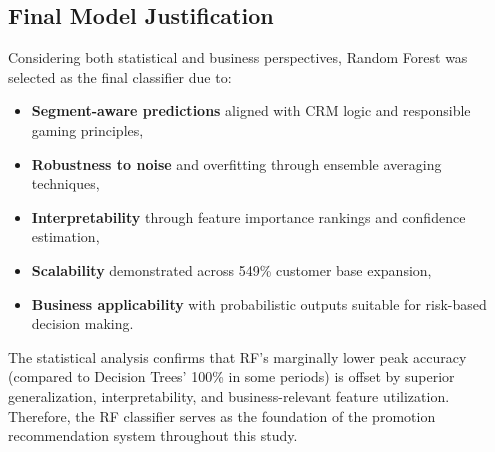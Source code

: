 \subsection*{Final Model Justification}

Considering both statistical and business perspectives, Random Forest was selected as the final classifier due to:

\begin{itemize}
\item \textbf{Segment-aware predictions} aligned with CRM logic and responsible gaming principles,
\item \textbf{Robustness to noise} and overfitting through ensemble averaging techniques,
\item \textbf{Interpretability} through feature importance rankings and confidence estimation,
\item \textbf{Scalability} demonstrated across 549\% customer base expansion,
\item \textbf{Business applicability} with probabilistic outputs suitable for risk-based decision making.
\end{itemize}

The statistical analysis confirms that RF's marginally lower peak accuracy (compared to Decision Trees' 100\% in some periods) is offset by superior generalization, interpretability, and business-relevant feature utilization. Therefore, the RF classifier serves as the foundation of the promotion recommendation system throughout this study.